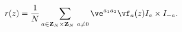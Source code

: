 \begin{equation}
r(z)=\frac1N
\sum_{a\in {\bf Z}_N\times {\bf Z}_N~a\neq 0 }
\ve^{a_1 a_2}\vf_a(z) I_a\times I_{-a}.
\label{elli}
\end{equation}

